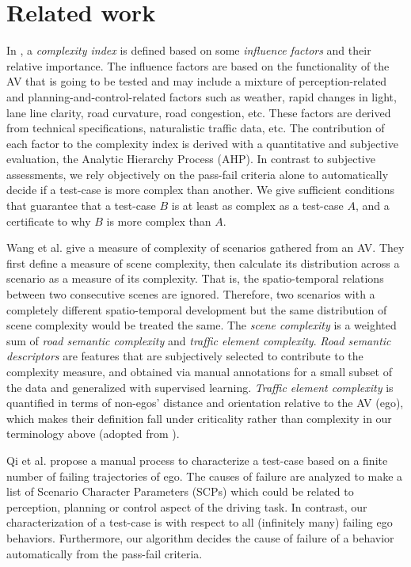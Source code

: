 \section{Related work}
In \cite{Xia.2017, Xia.2018, Gao.2019}, a \emph{complexity index} is defined based on some \emph{influence factors} and their relative importance.
%
The influence factors are based on the functionality of the AV that is going to be tested and may include a mixture of perception-related and planning-and-control-related factors such as weather, rapid changes in light, lane line clarity, road curvature, road congestion, etc.
%
These factors are derived from technical specifications, naturalistic traffic data, etc.
%
The contribution of each factor to the complexity index is derived with a quantitative and subjective evaluation, the Analytic Hierarchy Process (AHP).
%
In contrast to subjective assessments, we rely objectively on the pass-fail criteria alone to automatically decide if a test-case is more complex than another.
%
We give sufficient conditions that guarantee that a test-case $B$ is at least as complex as a test-case $A$, and a certificate to why $B$ is more complex than $A$.


Wang et al. \cite{Wang.2018} give a measure of complexity of scenarios gathered from an AV.
%
They first define a measure of scene complexity, then calculate its distribution across a scenario as a measure of its complexity.
%
That is, the spatio-temporal relations between two consecutive scenes are ignored.
%
Therefore, two scenarios with a completely different spatio-temporal development but the same distribution of scene complexity would be treated the same.
%
The \emph{scene complexity} is a weighted sum of \emph{road semantic complexity} and \emph{traffic element complexity}.
%
\emph{Road semantic descriptors} are features that are subjectively selected to contribute to the complexity measure, and obtained via manual annotations for a small subset of the data and generalized with supervised learning.
%
\emph{Traffic element complexity} is quantified in terms of non-egos' distance and orientation relative to the AV (ego), which makes their definition fall under criticality rather than complexity in our terminology above (adopted from \cite{Riedmaier.2020}).


Qi et al. \cite{Qi.2019} propose a manual process to characterize a test-case based on a finite number of failing trajectories of ego.
%
The causes of failure are analyzed to make a list of Scenario Character Parameters (SCPs) which could be related to perception, planning or control aspect of the driving task.
%
In contrast, our characterization of a test-case is with respect to all (infinitely many) failing ego behaviors.
%
Furthermore, our algorithm decides the cause of failure of a behavior automatically from the pass-fail criteria.

